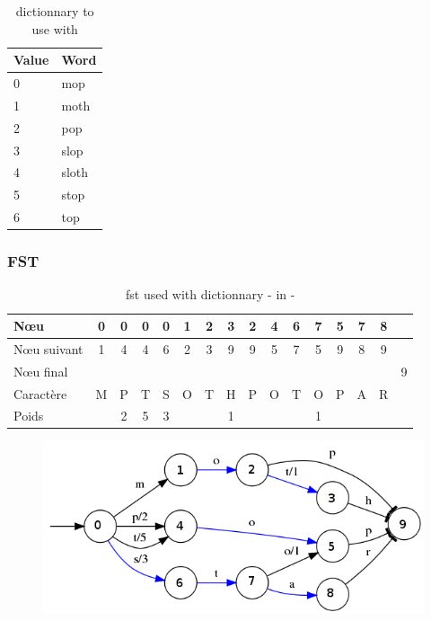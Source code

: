 \begin{table}[h]
    \centering
    \begin{tabular}{|l|l|}
        \hline
        Value & Word \\
        \hline
        0 & mop \\
        1 & moth \\
        2 & pop \\
        3 & slop \\
        4 & sloth \\
        5 & stop \\
        6 & top \\
        \hline
    \end{tabular}
    \caption{dictionnary to use with }
\end{table}

\subsubsection{FST}

\begin{table}[ht]
    \centering
    \begin{tabular}{|l||c|c|c|c|c|c|c|c|c|c|c|c|c|c|c|}
        \hline
        N\oe u & 0 & 0 & 0 & 0 & 1 & 2 & 3 & 2 & 4 & 6 & 7 & 5 & 7 & 8 & \\ \hline
        N\oe u suivant & 1 & 4 & 4 & 6 & 2 & 3 & 9 & 9 & 5 & 7 & 5 & 9 & 8 & 9 & \\ \hline
        N\oe u final &&&&&&&&&&&&&&& 9 \\ \hline
        Caractère & M & P & T & S& O & T & H & P & O & T & O & P & A & R & \\ \hline
        Poids & & 2 & 5 & 3 &&& 1 &&&&1&&&& \\ \hline
    \end{tabular}
    \caption{fst used with dictionnary - in -}
\end{table}

\begin{figure}[ht]
    \centering
\includegraphics[scale=0.5]{../c_asm/1.png}
\end{figure}


